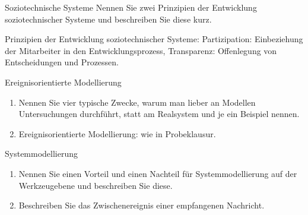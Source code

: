 \documentclass{article}
\begin{document}
\begin{exercise}{Soziotechnische Systeme}
  Nennen Sie zwei Prinzipien der Entwicklung soziotechnischer Systeme und beschreiben Sie diese kurz.

  \begin{solution}
    Prinzipien der Entwicklung soziotechnischer Systeme: Partizipation: Einbeziehung der Mitarbeiter in den Entwicklungsprozess, Transparenz: Offenlegung von Entscheidungen und Prozessen.
  \end{solution}
\end{exercise}



\begin{exercise}{Ereignisorientierte Modellierung}
  \begin{enumerate}
    \item Nennen Sie vier typische Zwecke, warum man lieber an Modellen Untersuchungen durchführt, statt am Realsystem und je ein Beispiel nennen.
    \item Ereignisorientierte Modellierung: wie in Probeklausur.
  \end{enumerate}

  \begin{solution}
  \end{solution}
\end{exercise}

\begin{exercise}{Systemmodellierung}
  \begin{enumerate}
    \item Nennen Sie einen Vorteil und einen Nachteil für Systemmodellierung auf der Werkzeugebene und beschreiben Sie diese.
    \item Beschreiben Sie das Zwischenereignis einer empfangenen Nachricht.
  \end{enumerate}

  \begin{solution}
  \end{solution}
\end{exercise}
\end{document}
